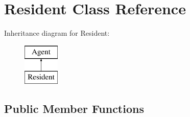 \hypertarget{classResident}{\section{Resident Class Reference}
\label{classResident}
}
Inheritance diagram for Resident\-:\begin{figure}[H]
\begin{center}
\leavevmode
\includegraphics[height=2.000000cm]{classResident}
\end{center}
\end{figure}
\subsection*{Public Member Functions}
